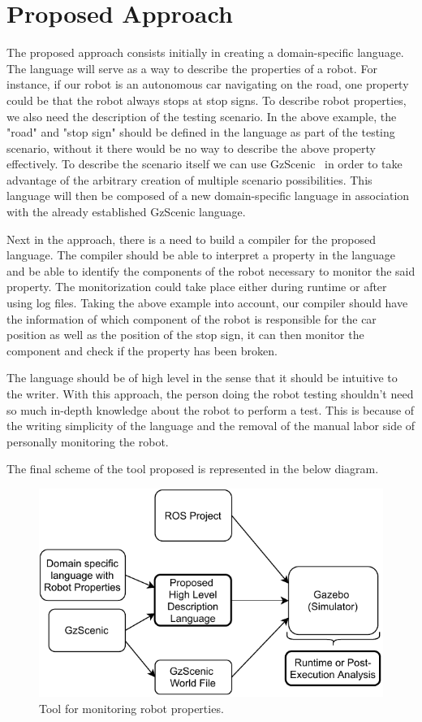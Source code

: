 \chapter{Proposed Approach}
\label{chap:approach}


The proposed approach consists initially in creating a domain-specific language.
The language will serve as a way to describe the properties of a robot.
For instance, if our robot is an autonomous car navigating on the road, 
one property could be that the robot always stops at stop signs.
To describe robot properties, we also need the description of the testing scenario.
In the above example, the "road" and "stop sign" should be defined in the language as part of the 
testing scenario, without it there would be no way to describe the above property effectively.
To describe the scenario itself we can use GzScenic~\cite{GzScenic} in order to take 
advantage of the arbitrary creation of multiple scenario possibilities.
This language will then be composed of a new domain-specific language in association 
with the already established GzScenic language.

\par

Next in the approach, there is a need to build a compiler for the proposed language.
The compiler should be able to interpret a property in the language and be able to
identify the components of the robot necessary to monitor the said property.
The monitorization could take place either during runtime or after using log files.
Taking the above example into account, our compiler should have the information of which 
component of the robot is responsible for the car position as well as the position of the 
stop sign, it can then monitor the component and check if the property has been broken.

\par

The language should be of high level in the sense that it should be intuitive to the writer.
With this approach, the person doing the robot testing shouldn't need so much in-depth 
knowledge about the robot to perform a test. This is because of the writing simplicity of 
the language and the removal of the manual labor side of personally monitoring the robot.

\par

The final scheme of the tool proposed is represented in the below diagram.

\begin{figure}
    \includegraphics{images/intro_diag.pdf}
    \caption{Tool for monitoring robot properties.}
    \label{fig:intro_objectives}
\end{figure}

